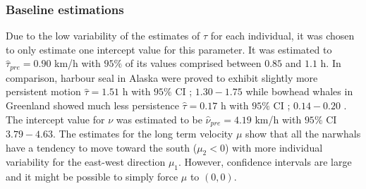 \documentclass[11pt]{article}
\newcommand {\1}{\mathbb{1}}
\begin{document}
\subsubsection{Baseline estimations}
Due to the low variability of the estimates of $\tau$ for each individual, it was chosen to only estimate one intercept value for this parameter. It was estimated to $\hat{\tau}_{pre}=0.90 $ km/h with $95 \%$ of its values comprised between $0.85$ and $1.1$ h.
In comparison, harbour seal in Alaska were proved to exhibit slightly more persistent motion $\hat{\tau}=1.51$ h with $95\%$ CI ; $1.30 -1.75$  \cite{johnson_continuous_2008} while bowhead whales in Greenland showed much less persistence $\hat{\tau}=0.17$ h with $95\%$ CI ; $0.14 -0.20$  \cite{gurarie_correlated_2017}.
The intercept value for $\nu$ was estimated to be $\hat{\nu}_{pre}=4.19$ km/h with $95\%$ CI $3.79-4.63$.
The estimates for the long term velocity $\mu$ show that all the narwhals have a tendency to move toward the south ($\mu_2<0$) with more individual variability for the east-west direction $\mu_1$. However, confidence intervals are large and it might be possible to simply force $\mu$ to $(0,0)$.
\end{document}

